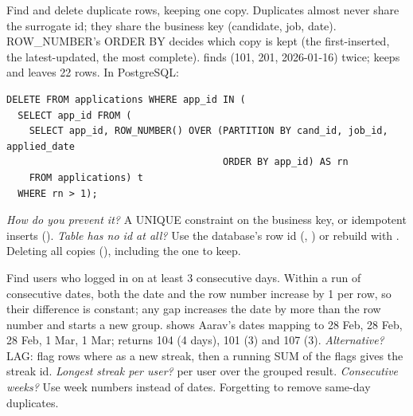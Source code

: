 \begin{qa}{\classic Find and delete duplicate rows, keeping one copy.}
\why Duplicates almost never share the surrogate id; they share the business key (candidate, job, date). ROW\_NUMBER's ORDER BY decides which copy is kept
(the first-inserted, the latest-updated, the most complete).
\worked {} finds (101, 201, 2026-01-16) twice;  keeps  and leaves 22 rows.
In PostgreSQL:
\begin{lstlisting}[style=sql]
DELETE FROM applications WHERE app_id IN (
  SELECT app_id FROM (
    SELECT app_id, ROW_NUMBER() OVER (PARTITION BY cand_id, job_id, applied_date
                                      ORDER BY app_id) AS rn
    FROM applications) t
  WHERE rn > 1);
\end{lstlisting}
\pushes \emph{How do you prevent it?} A UNIQUE constraint on the business key, or idempotent inserts ().
\emph{Table has no id at all?} Use the database's row id (, ) or rebuild with .
\pitfall Deleting all copies (), including the one to keep.
\end{qa}

\begin{qa}{\classic Find users who logged in on at least 3 consecutive days.}
\why Within a run of consecutive dates, both the date and the row number increase by 1 per row, so their difference is constant; any gap increases the
date by more than the row number and starts a new group.
\worked {} shows Aarav's dates mapping to 28 Feb, 28 Feb, 28 Feb, 1 Mar, 1 Mar;  returns 104 (4 days), 101 (3)
and 107 (3).
\pushes \emph{Alternative?} LAG: flag rows where  as a new streak, then a running SUM of the flags gives the streak id.
\emph{Longest streak per user?}  per user over the grouped result. \emph{Consecutive weeks?} Use week numbers instead of dates.
\pitfall Forgetting to remove same-day duplicates.
\end{qa}

